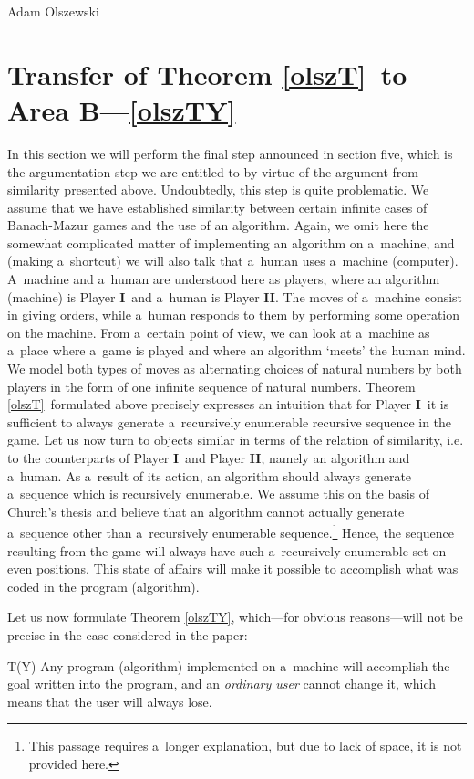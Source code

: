 \begin{artengenv}{Adam Olszewski}
\section{Transfer of Theorem \ref{olszT}~to Area B---\ref{olszTY}}
In this section we will perform the final step announced in section five, which is the argumentation step we are entitled to by virtue of the argument from similarity presented above. Undoubtedly, this step is quite problematic. We assume that we have established similarity between certain infinite cases of Banach-Mazur games and the use of an algorithm. Again, we omit here the somewhat complicated matter of implementing an algorithm on a~machine, and (making a~shortcut) we will also talk that a~human uses a~machine (computer). A~machine and a~human are understood here as players, where an algorithm (machine) is Player \textbf{I}~and a~human is Player \textbf{II}. The moves of a~machine consist in giving orders, while a~human responds to them by performing some operation on the machine. From a~certain point of view, we can look at a~machine as a~place where a~game is played and where an algorithm ‘meets' the human mind. We model both types of moves as alternating choices of natural numbers by both players in the form of one infinite sequence of natural numbers. Theorem \ref{olszT}~formulated above precisely expresses an intuition that for Player \textbf{I}~it is sufficient to always generate a~recursively enumerable recursive sequence in the game. Let us now turn to objects similar in terms of the relation of similarity, i.e. to the counterparts of Player \textbf{I}~and Player \textbf{II}, namely an algorithm and a~human. As a~result of its action, an algorithm should always generate a~sequence which is recursively enumerable. We assume this on the basis of Church's thesis and believe that an algorithm cannot actually generate a~sequence other than a~recursively enumerable sequence.\footnote{This passage requires a~longer explanation, but due to lack of space, it is not provided here.} Hence, the sequence resulting from the game will always have such a~recursively enumerable set on even positions. This state of affairs will make it possible to accomplish what was coded in the program (algorithm).

Let us now formulate Theorem \ref{olszTY}, which---for obvious reasons---will not be precise in the case considered in the paper:
\begin{customthm}{T(Y)}\label{olszTY}
Any program (algorithm) implemented on a~machine will accomplish the goal written into the program, and an \textit{ordinary user} cannot change it, which means that the user will always lose.
\end{customthm}

\end{artengenv}
